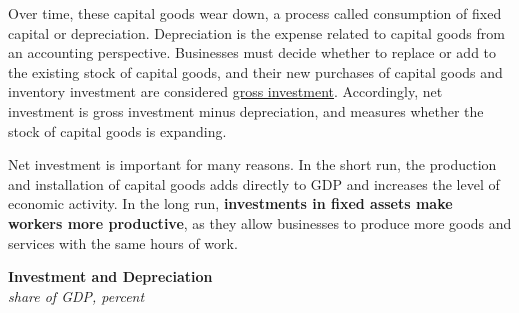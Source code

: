 \documentclass{report}
\makeatletter
\newcommand*\short[1]{\expandafter\@gobbletwo\number\numexpr#1\relax}
\newcommand{\stdnode}[3]{\node[below, align=left, shift=({#1,#2})]{#3};}
\newcommand{\shdateaxisticks}{
		date coordinates in=x, axis line style={draw=none},
		xmax={2023-11-30},
		max space between ticks=40,	    
		xtick={{1990-01-01}, {1995-01-01}, {2000-01-01}, 
			{2005-01-01}, {2010-01-01}, {2015-01-01}, {2020-01-01}},
		minor xtick={},
		enlarge y limits={0.06}, enlarge x limits={0.01},
		xticklabel style={align=center, yshift=-2pt}, tick label style={inner sep=0pt},
		}
\newcommand{\bbar}[2]{extra #1 ticks = {{#2}}, extra #1 tick labels = ,
		extra #1 tick style = {grid=major, grid style={thick, black!25}},}
\newcommand{\stdline}[4]{\addplot[very thick, no markers, color=#1] 
		table [x=#2, y=#3, col sep=comma] {#4};	}
\newcommand{\thickline}[4]{\addplot[ultra thick, no markers, color=#1] 
		table [x=#2, y=#3, col sep=comma] {#4};	}
\newcommand{\rbars}{
		\fill[color=black!10] (axis cs:{1990-07-01},\pgfkeysvalueof{/pgfplots/ymin}) rectangle 
			(axis cs:{1991-03-01}, \pgfkeysvalueof{/pgfplots/ymax});
		\fill[color=black!10] (axis cs:{2007-12-01},\pgfkeysvalueof{/pgfplots/ymin}) rectangle 
			(axis cs:{2009-07-01}, \pgfkeysvalueof{/pgfplots/ymax});
		\fill[color=black!10] (axis cs:{2001-03-01},\pgfkeysvalueof{/pgfplots/ymin}) rectangle 
			(axis cs:{2001-11-01}, \pgfkeysvalueof{/pgfplots/ymax});
		\fill[color=black!10] (axis cs:{2020-02-01},\pgfkeysvalueof{/pgfplots/ymin}) rectangle 
			(axis cs:{2020-05-01}, \pgfkeysvalueof{/pgfplots/ymax});}
\makeatother
\begin{document}
{\begin{minipage}{0.76\textwidth}
Over time, these capital goods wear down, a process called consumption of fixed capital or depreciation. Depreciation is the expense related to capital goods from an accounting perspective. Businesses must decide whether to replace or add to the existing stock of capital goods, and their new purchases of capital goods and inventory investment are considered \href{https://www.bea.gov/help/glossary/gross-private-domestic-investment}{gross investment}. Accordingly, net investment is gross investment minus depreciation, and measures whether the stock of capital goods is expanding.

Net investment is important for many reasons. In the short run, the production and installation of capital goods adds directly to GDP and increases the level of economic activity. In the long run, \textbf{investments in fixed assets make workers more productive}, as they allow businesses to produce more goods and services with the same hours of work. 
\end{minipage}
\vspace{1mm}

\begin{minipage}{0.355\textwidth}
\normalsize \textbf{Investment and Depreciation}\\
\footnotesize{\textit{share of GDP, percent}}
\vspace{6.5cm}

\hspace{2mm} 


\end{minipage}}
\end{document}
